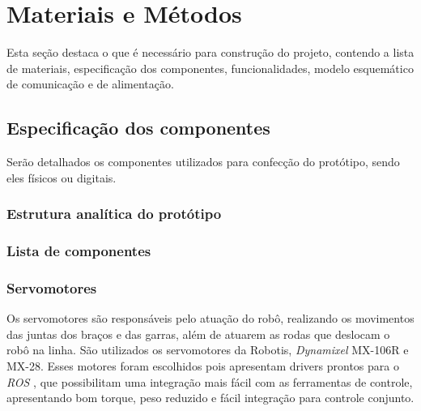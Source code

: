 \chapter{Materiais e Métodos}
\label{chap:mat}
Esta seção destaca o que é necessário para construção do projeto, contendo a lista de materiais, especificação dos componentes, funcionalidades, modelo esquemático de comunicação e de alimentação.

\section{Especificação dos componentes}
\label{sec:espc}
Serão detalhados os componentes utilizados para confecção do protótipo, sendo eles físicos ou digitais.

\subsection{Estrutura analítica do protótipo}
\label{ssec:pbs}


\subsection{Lista de componentes}
\label{ssec:list}

\subsection{Servomotores}
Os servomotores são responsáveis pelo atuação do robô, realizando os movimentos das juntas dos braços e das garras, além de atuarem as rodas que deslocam o robô na linha. São utilizados os servomotores da Robotis, \textit{Dynamixel} MX-106R e MX-28. Esses motores foram escolhidos pois apresentam drivers prontos para o \textit{ROS} , que possibilitam uma integração mais fácil com as ferramentas de controle, apresentando bom torque, peso reduzido e fácil integração para controle conjunto.


